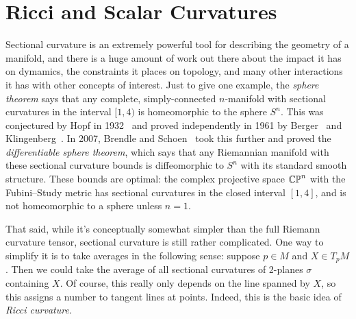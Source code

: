 
\section{Ricci and Scalar Curvatures}
\label{sec:Ricci and scalar curvatures}

Sectional curvature is an extremely powerful tool for describing the geometry of a manifold, and there is a huge amount of work out there about the impact it has on dymamics, the constraints it places on topology, and many other interactions it has with other concepts of interest. Just to give one example, the \emph{sphere theorem} says that any complete, simply-connected $n$-manifold with sectional curvatures in the interval $[1,4)$ is homeomorphic to the sphere $S^n$. This was conjectured by Hopf in 1932~\cite{hopfDifferentialgeometrieUndTopologische1932} and proved independently in 1961 by Berger~\cite{bergerVarietesRiemanniennesHomogenes1961} and Klingenberg~\cite{klingenbergUeberRiemannscheMannigfaltigkeiten1961}. In 2007, Brendle and Schoen~\cite{brendleManifolds14pinched2008} took this further and proved the \emph{differentiable sphere theorem}, which says that any Riemannian manifold with these sectional curvature bounds is diffeomorphic to $S^n$ with its standard smooth structure. These bounds are optimal: the complex projective space $\mathbb{CP}^n$ with the Fubini–Study metric has sectional curvatures in the closed interval $[1,4]$, and is not homeomorphic to a sphere unless $n=1$.

That said, while it's conceptually somewhat simpler than the full Riemann curvature tensor, sectional curvature is still rather complicated. One way to simplify it is to take averages in the following sense: suppose $p \in M$ and $X \in T_pM$. Then we could take the average of all sectional curvatures of 2-planes $\sigma$ containing $X$. Of course, this really only depends on the line spanned by $X$, so this assigns a number to tangent lines at points. Indeed, this is the basic idea of \emph{Ricci curvature}.

